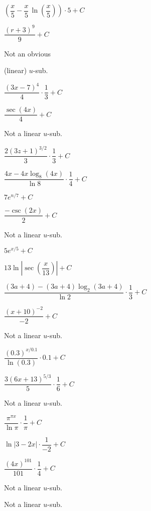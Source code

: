 \documentclass[11pt,letterpaper]{article}
\newenvironment{3enumerate}{%
	\begin{enumerate}[(1)]
	\begin{multicols}{3}
	}{%
	\end{multicols}
	\end{enumerate}
}
\begin{document}
\begin{3enumerate}
\item $\left( \dfrac{x}{5} - \dfrac{x}{5} \, \ln\left( \dfrac{x}{5} \right) \right) \cdot 5 + C$
\item $\dfrac{(r + 3)^9}{9} + C$
\item Not an obvious \par (linear) $u$-sub.
\item $\dfrac{(3x - 7)^4}{4} \cdot \dfrac{1}{3} + C$
\item $\dfrac{\sec(4x)}{4} + C$
\item Not a linear $u$-sub.
\item $\dfrac{2(3z + 1)^{3/2}}{3} \cdot \dfrac{1}{3} + C$
\item $\dfrac{4x - 4x \log_8(4x)}{\ln 8} \cdot \dfrac{1}{4} + C$
\item $7e^{n/7} + C$
\item $\dfrac{-\csc(2x)}{2} + C$
\item Not a linear $u$-sub.
\item $5e^{x/5} + C$
\item $13 \ln \left| \sec\left( \dfrac{x}{13} \right) \right| + C$
\item {\scriptsize$\dfrac{(3a + 4) - (3a + 4) \log_2(3a + 4)}{\ln 2} \cdot \dfrac{1}{3} + C$}
\item $\dfrac{(x + 10)^{-2}}{-2} + C$
\item Not a linear $u$-sub.
\item $\dfrac{(0.3)^{x/0.1}}{\ln(0.3)} \cdot 0.1 + C$
\item $\dfrac{3(6x + 13)^{5/3}}{5} \cdot \dfrac{1}{6} + C$
\item Not a linear $u$-sub.
\item $\dfrac{\pi^{\pi x}}{\ln \pi} \cdot \dfrac{1}{\pi} + C$
\item $\ln|3 - 2x| \cdot \dfrac{1}{-2} + C$
\item $\dfrac{(4x)^{101}}{101} \cdot \dfrac{1}{4} + C$
\item Not a linear $u$-sub.
\item Not a linear $u$-sub.
\end{3enumerate}
\end{document}
